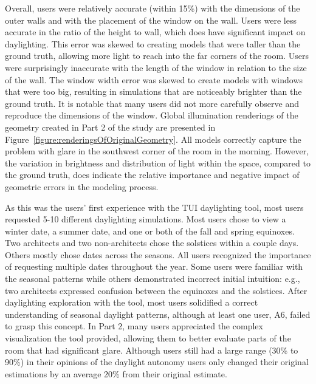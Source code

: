 Overall, users were relatively accurate (within 15\%) with the
dimensions of the outer walls and with the placement of the window on
the wall.  Users were less accurate in the ratio of the height to
wall, which does have significant impact on daylighting.  
This error was skewed to creating models that were taller than the
ground truth, allowing more light 
to reach
 into the far corners of the
room.  
%
Users were surprisingly inaccurate with the length of the window in
relation to the size of the wall.  The window width error was skewed
to create models with windows that were too big, resulting in
simulations that are noticeably brighter than the ground truth.
It is notable that many users did not 
more 
carefully observe and
reproduce the dimensions of the window.  
%
Global illumination renderings of the geometry created in Part 2 of
the study are presented in
Figure~\ref{figure:renderingsOfOriginalGeometry}.  All models
correctly capture the problem with glare in the southwest corner of
the room in the morning.  However, the variation in brightness and
distribution of light within the space, compared to the ground truth,
does indicate the relative importance and negative impact of geometric
errors in the modeling process.


As this was the users' first experience with the TUI daylighting tool,
most users requested 5-10 different daylighting simulations.  Most
users chose to view a winter date, a summer date, and one or both of
the fall and spring equinoxes.  Two architects and two non-architects
chose the solstices within a couple days.  Others mostly chose dates
across the seasons.  All users recognized the importance of requesting
multiple dates throughout the year.  Some users were familiar with the
seasonal patterns while others demonstrated incorrect initial
intuition: e.g., two architects expressed confusion between the
equinoxes and the solstices.  After daylighting exploration with the
tool, most users solidified a correct understanding of seasonal
daylight patterns, although at least one user, A6, failed to grasp
this concept.  In Part 2, many users appreciated the complex
visualization the tool provided, allowing them to better evaluate
parts of the room that had significant glare.  Although users still
had a large range (30\% to 90\%) in their opinions of the daylight
autonomy users only changed their original estimations by an average
20\% from their original estimate.  


